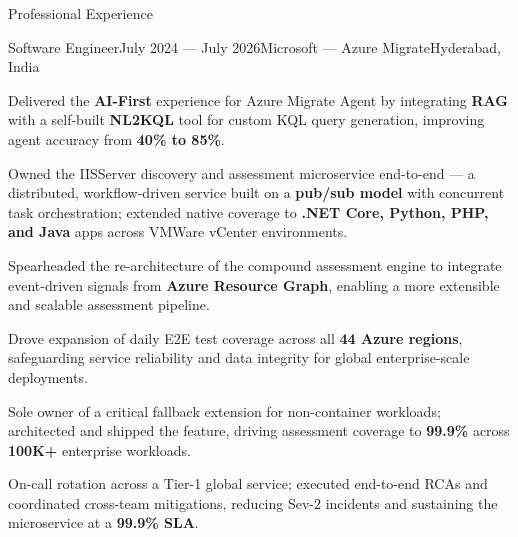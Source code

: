 
\begin{rSection}{Professional Experience}

    \begin{rSubsection}{Software Engineer}{July 2024 --- July 2026}{Microsoft --- Azure Migrate}{Hyderabad, India}
        \item Delivered the \textbf{AI-First} experience for Azure Migrate Agent by integrating \textbf{RAG} with a self-built \textbf{NL2KQL} tool for custom KQL query generation, improving agent accuracy from \textbf{40\% to 85\%}.
        \item Owned the IISServer discovery and assessment microservice end-to-end --- a distributed, workflow-driven service built on a \textbf{pub/sub model} with concurrent task orchestration; extended native coverage to \textbf{.NET Core, Python, PHP, and Java} apps across VMWare vCenter environments.
        \item Spearheaded the re-architecture of the compound assessment engine to integrate event-driven signals from \textbf{Azure Resource Graph}, enabling a more extensible and scalable assessment pipeline.
        \item Drove expansion of daily E2E test coverage across all \textbf{44 Azure regions}, safeguarding service reliability and data integrity for global enterprise-scale deployments.
        \item Sole owner of a critical fallback extension for non-container workloads; architected and shipped the feature, driving assessment coverage to \textbf{99.9\%} across \textbf{100K+} enterprise workloads.
        \item On-call rotation across a Tier-1 global service; executed end-to-end RCAs and coordinated cross-team mitigations, reducing Sev-2 incidents and sustaining the microservice at a \textbf{99.9\% SLA}.
    \end{rSubsection}


\end{rSection}
